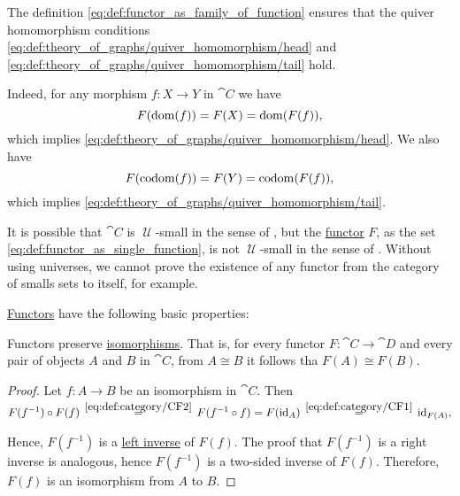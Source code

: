 \begin{defproof}
  The definition \eqref{eq:def:functor_as_family_of_function} ensures that the quiver homomorphism conditions \eqref{eq:def:theory_of_graphs/quiver_homomorphism/head} and \eqref{eq:def:theory_of_graphs/quiver_homomorphism/tail} hold.

  Indeed, for any morphism \( f: X \to Y \) in \( \cat{C} \) we have
  \begin{equation*}
    F(\operatorname{dom}(f)) = F(X) = \operatorname{dom}(F(f)),
  \end{equation*}
  which implies \eqref{eq:def:theory_of_graphs/quiver_homomorphism/head}. We also have
  \begin{equation*}
    F(\operatorname*{co\negthinspace\operatorname{dom}}(f)) = F(Y) = \operatorname*{co\negthinspace\operatorname{dom}}(F(f)),
  \end{equation*}
  which implies \eqref{eq:def:theory_of_graphs/quiver_homomorphism/tail}.
\end{defproof}

\begin{remark}\label{rem:functor_size}
  It is possible that \( \cat{C} \) is \( \mscrU \)-small in the sense of , but the \hyperref[def:functor]{functor} \( F \), as the set \eqref{eq:def:functor_as_single_function}, is not \( \mscrU \)-small in the sense of . Without using universes, we cannot prove the existence of any functor from the category of smalls sets to itself, for example.
\end{remark}

\begin{proposition}\label{thm:def:functor/properties}
  \hyperref[def:functor]{Functors} have the following basic properties:
  \begin{thmenum}
     Functors preserve \hyperref[def:morphism_invertibility/isomorphism]{isomorphisms}. That is, for every functor \( F: \cat{C} \to \cat{D} \) and every pair of objects \( A \) and \( B \) in \( \cat{C} \), from \( A \cong B \) it follows tha \( F(A) \cong F(B) \).
  \end{thmenum}
\end{proposition}
\begin{proof}
   Let \( f: A \to B \) be an isomorphism in \( \cat{C} \). Then
  \begin{equation}\label{eq:thm:def:functor/properties/isomorphisms}
    F(f^{-1}) \bincirc F(f)
    \reloset {\eqref{eq:def:category/CF2}} =
    F(f^{-1} \bincirc f)
    =
    F(\id_A)
    \reloset {\eqref{eq:def:category/CF1}} =
    \id_{F(A)},
  \end{equation}

  Hence, \( F(f^{-1}) \) is a \hyperref[morphism_invertibility/left_invertible]{left inverse} of \( F(f) \). The proof that \( F(f^{-1}) \) is a right inverse is analogous, hence \( F(f^{-1}) \) is a two-sided inverse of \( F(f) \). Therefore, \( F(f) \) is an isomorphism from \( A \) to \( B \).
\end{proof}

